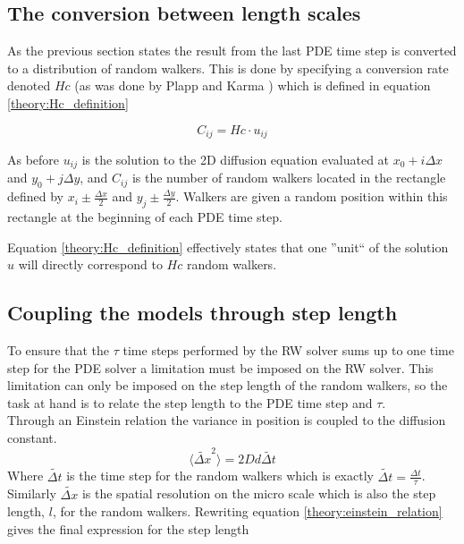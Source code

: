 \subsection{The conversion between length scales}
As the previous section states the result from the last PDE time step is converted to a distribution of random walkers. 
This is done by specifying a conversion rate denoted $Hc$ (as was done by Plapp and Karma \cite{plapp2000multiscale}) which is defined in equation \eqref{theory:Hc_definition}

\begin{equation}\label{theory:Hc_definition}
 C_{ij} = Hc\cdot u_{ij}
\end{equation}

\noindent As before $u_{ij}$ is the solution to the 2D diffusion equation evaluated at $x_0 +i\Delta x$ and $y_0 +j\Delta y$, and $C_{ij}$ is the number of random walkers located in the rectangle defined by $x_i\pm\frac{\Delta x}{2}$ and $y_j\pm\frac{\Delta y}{2}$. 
Walkers are given a random position within this rectangle at the beginning of each PDE time step. 

Equation \eqref{theory:Hc_definition} effectively states that one ''unit`` of the solution $u$ will directly correspond to $Hc$ random walkers.

\subsection{Coupling the models through step length}

To ensure that the $\tau$ time steps performed by the RW solver sums up to one time step for the PDE solver a limitation must be imposed on the RW solver. 
This limitation can only be imposed on the step length of the random walkers, so the task at hand is to relate the step length to the PDE time step and $\tau$. \\
Through an Einstein relation the variance in position is coupled to the diffusion constant.
\begin{equation}\label{theory:einstein_relation}
 \langle\tilde{\Delta x}^2\rangle = 2Dd\tilde{\Delta t}
\end{equation}
Where $\tilde{\Delta t}$ is the time step for the random walkers which is exactly $\tilde{\Delta t} = \frac{\Delta t}{\tau}$. 
Similarly $\tilde{\Delta x}$ is the spatial resolution on the micro scale which is also the step length, $l$, for the random walkers. 
Rewriting equation \eqref{theory:einstein_relation} gives the final expression for the step length

